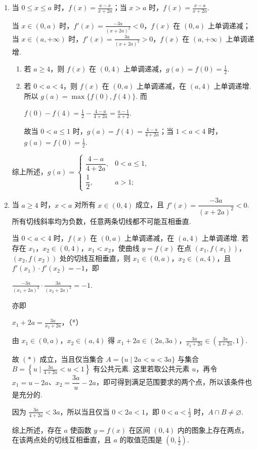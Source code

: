 \begin{solution}
\begin{enumerate}
\item 当 \(0\leqslant x\leqslant a\) 时，\(f(x)=\frac{a-x}{x+2a}\)；当 \(x>a\) 时，\(f(x)=\frac{x-a}{x+2a}\).

当 \(x\in(0,a)\) 时，\(f'(x)=\frac{-3a}{(x+2a)^2}<0\)，\(f(x)\) 在 \((0,a)\) 上单调递减；当 \(x\in(a,+\infty)\) 时，\(f'(x)=\frac{3a}{(x+2a)^2}>0\)，\(f(x)\) 在 \((a,+\infty)\) 上单调递增.

\begin{enumerate}
\item 若 \(a\geqslant4\)，则 \(f(x)\) 在 \((0,4)\) 上单调递减，\(g(a)=f(0)=\frac{1}{2}\).

\item 若 \(0<a<4\)，则 \(f(x)\) 在 \((0,a)\) 上单调递减，在 \((a,4)\) 上单调递增. 所以 \(g(a)=\max\{f(0),f(4)\}\). 而

\(f(0)-f(4)=\frac{1}{2}-\frac{4-a}{4+2a}=\frac{a-1}{a+2}\).

故当 \(0<a\leqslant1\) 时，\(g(a)=f(4)=\frac{4-a}{4+2a}\)；当 \(1<a<4\) 时，\(g(a)=f(0)=\frac{1}{2}\).
\end{enumerate}

综上所述，\(g(a)=\begin{cases}
\dfrac{4-a}{4+2a}, & 0<a\leqslant 1,\\
\dfrac{1}{2}, & a>1;
\end{cases}\)

\item 当 \(a\geqslant4\) 时，\(x<a\) 对所有 \(x\in(0,4)\) 成立，且 \(f'(x)=\dfrac{-3a}{(x+2a)^2}<0\). 所有切线斜率均为负数，任意两条切线都不可能互相垂直.

当 \(0<a<4\) 时，\(f(x)\) 在 \((0,a)\) 上单调递减，在 \((a,4)\) 上单调递增. 若存在 \(x_1\)，\(x_2\in(0,4)\)，\(x_1<x_2\)，使曲线 \(y=f(x)\) 在点 \((x_1,f(x_1))\)，\((x_2,f(x_2))\) 处的切线互相垂直，则 \(x_1\in(0,a)\)，\(x_2\in(a,4)\)，且 \(f'(x_1)\cdot f'(x_2)=-1\)，即

\(\frac{-3a}{(x_1+2a)^2}\cdot\frac{3a}{(x_2+2a)^2}=-1\).

亦即

\(x_1+2a=\frac{3a}{x_2+2a}\)，（*）

由 \(x_1\in(0,a)\)，\(x_2\in(a,4)\) 得 \(x_1+2a\in(2a,3a)\)，\(\frac{3a}{x_2+2a}\in\left(\frac{3a}{4+2a},1\right)\).

故 \((*)\) 成立，当且仅当集合 \(A=\{u\mid 2a<u<3a\}\) 与集合 \(B=\left\{u\mid\frac{3a}{4+2a}<u<1\right\}\) 有公共元素. 这里若取公共元素 \(u\)，再令 \(x_1=u-2a\)、\(x_2=\dfrac{3a}{u}-2a\)，即可得到满足范围要求的两个点，所以该条件也是充分的.

因为 \(\frac{3a}{4+2a}<3a\)，所以当且仅当 \(0<2a<1\)，即 \(0<a<\frac{1}{2}\) 时，\(A\cap B\ne\varnothing\).

综上所述，存在 \(a\) 使函数 \(y=f(x)\) 在区间 \((0,4)\) 内的图象上存在两点，在该两点处的切线互相垂直，且 \(a\) 的取值范围是 \(\left(0,\frac{1}{2}\right)\).
\end{enumerate}
\end{solution}
